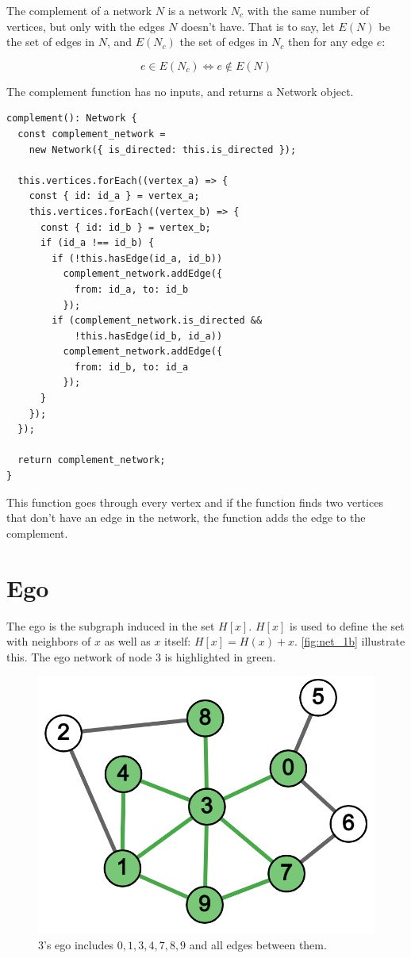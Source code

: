 The complement of a network $N$ is a network $N_c$ with the same number of vertices,
but only with the edges $N$ doesn't have.
That is to say, let $E(N)$ be the set of edges in $N$,
and $E(N_c)$ the set of edges in $N_c$ then for any edge $e$:

$$e\in E(N_c)\iff e \notin E(N)$$

The complement function has no inputs, and returns a Network object.
\begin{verbatim}
complement(): Network {
  const complement_network =
    new Network({ is_directed: this.is_directed });

  this.vertices.forEach((vertex_a) => {
    const { id: id_a } = vertex_a;
    this.vertices.forEach((vertex_b) => {
      const { id: id_b } = vertex_b;
      if (id_a !== id_b) {
        if (!this.hasEdge(id_a, id_b))
          complement_network.addEdge({
            from: id_a, to: id_b
          });
        if (complement_network.is_directed &&
            !this.hasEdge(id_b, id_a))
          complement_network.addEdge({
            from: id_b, to: id_a
          });
      }
    });
  });

  return complement_network;
}
\end{verbatim}

This function goes through every vertex and if
the function finds two vertices that don't have an edge in the network,
the function adds the edge to the complement.

\section{Ego}

The ego is the subgraph induced in the set $H[x]$.
$H[x]$ is used to define the
set with neighbors of $x$ as well as $x$ itself:
$H[x] = H(x) + x$.
\ref{fig:net_1b} illustrate this.
The ego network of node $3$ is highlighted in green.

\begin{figure}[H]
  \centering
  \includegraphics[scale=.25]{img/ego_3.png}
  \caption{3's ego includes $0,1,3,4,7,8,9$ and all edges between them.}
  \label{fig:core_ex}
\end{figure}

